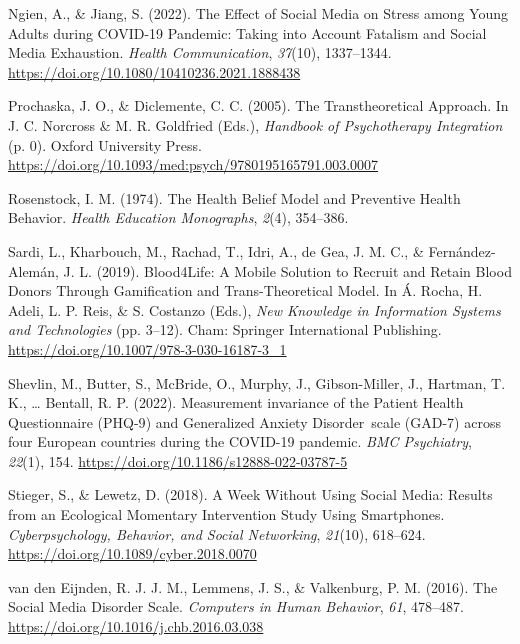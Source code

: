 \documentclass[
  man]{apa6}
\newlength{\cslhangindent}
\newlength{\cslentryspacingunit} %
\newenvironment{CSLReferences}[2] %
 {%
  \setlength{\parindent}{0pt}
  \ifodd #1
  \let\oldpar\par
  \def\par{\hangindent=\cslhangindent\oldpar}
  \fi
  \setlength{\parskip}{#2\cslentryspacingunit}
 }%
 {}
\begin{document}
\begin{CSLReferences}{1}{0}
\leavevmode{}%
Ngien, A., \& Jiang, S. (2022). The {Effect} of {Social Media} on {Stress} among {Young Adults} during {COVID-19 Pandemic}: {Taking} into {Account Fatalism} and {Social Media Exhaustion}. \emph{Health Communication}, \emph{37}(10), 1337--1344. \url{https://doi.org/10.1080/10410236.2021.1888438}

\leavevmode{}%
Prochaska, J. O., \& Diclemente, C. C. (2005). The {Transtheoretical Approach}. In J. C. Norcross \& M. R. Goldfried (Eds.), \emph{Handbook of {Psychotherapy Integration}} (p. 0). {Oxford University Press}. \url{https://doi.org/10.1093/med:psych/9780195165791.003.0007}

\leavevmode{}%
Rosenstock, I. M. (1974). The {Health Belief Model} and {Preventive Health Behavior}. \emph{Health Education Monographs}, \emph{2}(4), 354--386.

\leavevmode{}%
Sardi, L., Kharbouch, M., Rachad, T., Idri, A., de Gea, J. M. C., \& Fernández-Alemán, J. L. (2019). {Blood4Life}: {A Mobile Solution} to {Recruit} and {Retain Blood Donors Through Gamification} and {Trans-Theoretical Model}. In Á. Rocha, H. Adeli, L. P. Reis, \& S. Costanzo (Eds.), \emph{New {Knowledge} in {Information Systems} and {Technologies}} (pp. 3--12). {Cham}: {Springer International Publishing}. \url{https://doi.org/10.1007/978-3-030-16187-3_1}

\leavevmode{}%
Shevlin, M., Butter, S., McBride, O., Murphy, J., Gibson-Miller, J., Hartman, T. K., \ldots{} Bentall, R. P. (2022). Measurement invariance of the {Patient Health Questionnaire} ({PHQ-9}) and {Generalized Anxiety Disorder}~scale ({GAD-7}) across four {European} countries during the {COVID-19} pandemic. \emph{BMC Psychiatry}, \emph{22}(1), 154. \url{https://doi.org/10.1186/s12888-022-03787-5}

\leavevmode{}%
Stieger, S., \& Lewetz, D. (2018). A {Week Without Using Social Media}: {Results} from an {Ecological Momentary Intervention Study Using Smartphones}. \emph{Cyberpsychology, Behavior, and Social Networking}, \emph{21}(10), 618--624. \url{https://doi.org/10.1089/cyber.2018.0070}

\leavevmode{}%
van den Eijnden, R. J. J. M., Lemmens, J. S., \& Valkenburg, P. M. (2016). The {Social Media Disorder Scale}. \emph{Computers in Human Behavior}, \emph{61}, 478--487. \url{https://doi.org/10.1016/j.chb.2016.03.038}


\end{CSLReferences}
\end{document}
